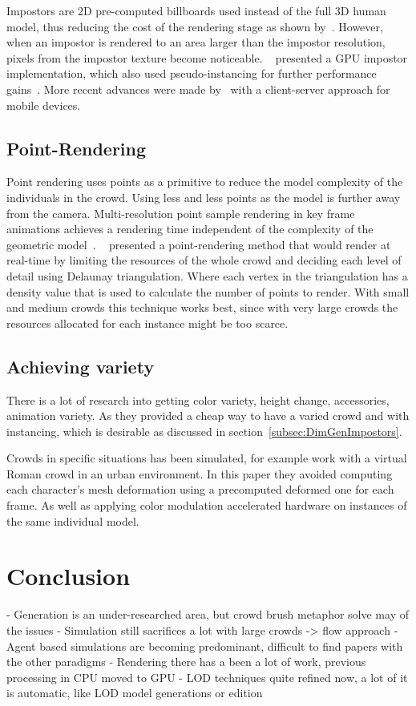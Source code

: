 \documentclass[11pt,twocolumn]{article}
\numberwithin{equation}{section} %
\numberwithin{figure}{section} %
\numberwithin{table}{section} %
\begin{document}
Impostors are 2D pre-computed billboards used instead of the full 3D human model, thus reducing the cost of the rendering stage as shown by~\cite{Aubel2000}.
However, when an impostor is rendered to an area larger than the impostor resolution, pixels from the impostor texture become noticeable.
~\cite{Millan2006} presented a GPU impostor implementation, which also used pseudo-instancing for further performance gains~\cite{zelsnack2004glsl}.
More recent advances were made by~\cite{Ghiletiuc2013} with a client-server approach for mobile devices.

\subsection{Point-Rendering}

Point rendering uses points as a primitive to reduce the model complexity of the individuals in the crowd.
Using less and less points as the model is further away from the camera.
Multi-resolution point sample rendering in key frame animations achieves a rendering time independent of the complexity of the geometric model~\cite{Wand2002}.
~\cite{Larkin2010} presented a point-rendering method that would render at real-time by limiting the resources of the whole crowd and deciding each level of detail using Delaunay triangulation. 
Where each vertex in the triangulation has a density value that is used to calculate the number of points to render.
With small and medium crowds this technique works best, since with very large crowds the resources allocated for each instance might be too scarce.

\subsection{Achieving variety}

There is a lot of research into getting color variety, height change, accessories, animation variety.
As they provided a cheap way to have a varied crowd and with instancing, which is desirable as discussed in section~\ref{subsec:DimGenImpostors}.

Crowds in specific situations has been simulated, for example \cite{deHeras2005} work with a virtual Roman crowd in an urban environment.
In this paper they avoided computing each character’s mesh deformation using a precomputed deformed one for each frame.
As well as applying color modulation accelerated hardware on instances of the same individual model.

\section{Conclusion}

- Generation is an under-researched area, but crowd brush metaphor solve may of the issues
- Simulation still sacrifices a lot with large crowds -> flow approach
- Agent based simulations are becoming predominant, difficult to find papers with the other paradigms
- Rendering there has a been a lot of work, previous processing in CPU moved to GPU
- LOD techniques quite refined now, a lot of it is automatic, like LOD model generations or edition

%


\end{document}
